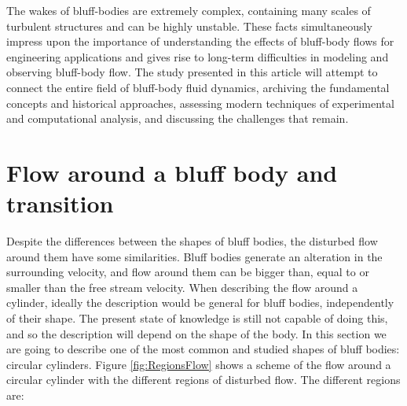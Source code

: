 \documentclass[journal]{new-aiaa}
\begin{document}
The wakes of bluff-bodies are extremely complex, containing many scales of turbulent structures and can be highly unstable. These facts simultaneously impress upon the importance of understanding the effects of bluff-body flows for engineering applications and gives rise to long-term difficulties in modeling and observing bluff-body flow. The study presented in this article will attempt to connect the entire field of bluff-body fluid dynamics, archiving the fundamental concepts and historical approaches, assessing modern techniques of experimental and computational analysis, and discussing the challenges that remain.








































\section{Flow around a bluff body and transition}

Despite the differences between the shapes of bluff bodies, the disturbed flow around them have some similarities. Bluff bodies generate an alteration in the surrounding velocity, and flow around them can be bigger than, equal to or smaller than the free stream velocity. When describing the flow around a cylinder, ideally  the description would be general for bluff bodies, independently of their shape. The present state of knowledge is still not capable of doing this, and so the description will depend on the shape of the body. In this section we are going to describe one of the most common and studied shapes of bluff bodies: circular cylinders. Figure \ref{fig:RegionsFlow} shows a scheme of the flow around a circular cylinder with the different regions of disturbed flow. The different regions are:
\end{document}
